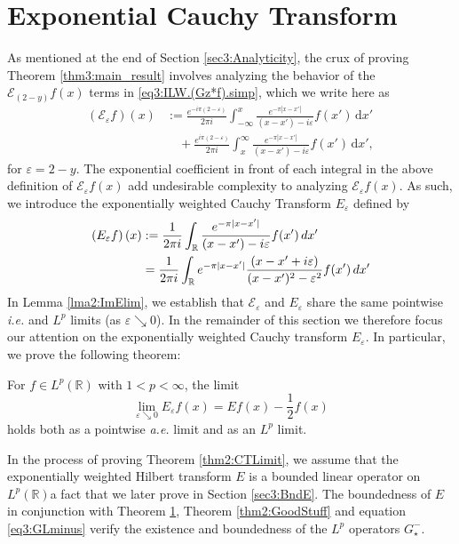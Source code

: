 \documentclass[../dissertation.tex]{subfiles}
\begin{document}
\section{Exponential Cauchy Transform}\label{sec3:CauchyTrans}

As mentioned at the end of Section \ref{sec3:Analyticity}, the crux of proving 
Theorem \ref{thm3:main_result} involves analyzing the behavior of the 
$\mathcal E_{(2-y)} f(x)$ terms in \eqref{eq3:ILW.(Gz*f).simp}, which we 
write here as
\begin{align*}
	\left( \mathcal E_\varepsilon f \right)(x) 
		&:=  \frac{e^{-i \pi (2-\varepsilon)}}{2 \pi i} 
			\int_{-\infty}^x 
				\frac{e^{-\pi|x-x'|}}{(x-x') - i\varepsilon} f(x') 
			\, \mathrm{d}x' \\
		&\quad + \frac{e^{i \pi (2-\varepsilon)}}{2 \pi i} 
			\int_x^{\infty} 
				\frac{e^{-\pi|x-x'|} }{(x-x') - i\varepsilon} f(x') 
			\, \mathrm{d}x',
\end{align*}
for $\varepsilon = 2-y$. The exponential coefficient in front of each integral 
in the above definition of $\mathcal E_{\varepsilon}f(x)$ add undesirable 
complexity to analyzing $\mathcal E_{\varepsilon}f(x)$.\label{sym:expCauchy} As 
such, we introduce the exponentially weighted Cauchy Transform $E_\varepsilon$ 
defined by
\begin{align*}
	\left( E_\varepsilon f\right)(x)
 		&:= \frac{1}{2\pi i} \int_{\mathbb R} 
 				\frac{e^{-\pi|x-x'|}}{(x - x') - i \varepsilon} f(x') 
 			\,dx' \\
 		&= \frac{1}{2\pi i} \int_{\mathbb R} 
 				e^{-\pi|x-x'|} \frac{(x-x'+i\varepsilon)}{(x - x')^2 - \varepsilon^2} f(x') 
 			\,dx'
\end{align*}
In Lemma \ref{lma2:ImElim}, we establish that $\mathcal E_\varepsilon$ and $E_\varepsilon$
share the same pointwise \textit{i.e.} and $L^p$ limits (as $\varepsilon \searrow 0$).
In the remainder of this section we therefore focus our attention on the exponentially 
weighted Cauchy transform $E_\varepsilon$. In particular, we prove the following theorem:
\begin{thm}\label{thm2:CTLimit}
	For $f \in L^p(\mathbb R)$ with $1<p<\infty$, the limit 
	\[
		\lim_{\varepsilon\searrow 0} E_\varepsilon f(x) = Ef(x) - \frac{1}{2} f(x)
	\]
	holds both as a pointwise \textit{a.e.} limit and as an $L^p$ limit. 
\end{thm}
In the process of proving Theorem \ref{thm2:CTLimit}, we assume that the exponentially
weighted Hilbert transform 
$E$ is a bounded linear operator on $L^p(\mathbb R)$\textemdash{}a fact that we
later prove in Section \ref{sec3:BndE}. The boundedness of $E$ in conjunction with 
Theorem \ref{sec3:CauchyTrans}, Theorem \ref{thm2:GoodStuff} and equation 
\eqref{eq3:GLminus} verify the existence and boundedness of the $L^p$ 
operators $G_\star^-$.
\end{document}
